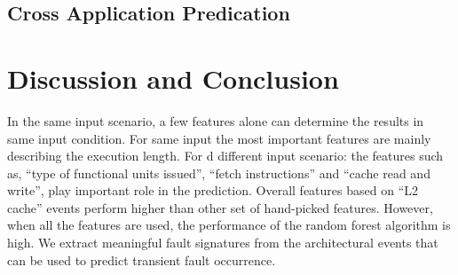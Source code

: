 \documentclass{sig-alternate}
\begin{document}
\subsection{Cross Application Predication}


\section{Discussion and Conclusion}
In the same input scenario, a few features alone can determine the results in same input condition. For same input the most important features are mainly describing the execution length. For d different input scenario: the features such as, “type of functional units issued”, “fetch instructions” and “cache read and write”, play important role in the prediction. Overall features based on “L2 cache” events perform higher than other set of hand-picked features. However, when all the features are used, the performance of the random forest algorithm is high. We extract meaningful fault signatures from the architectural events that can be used to predict transient fault occurrence.





\end{document}
